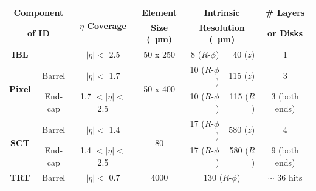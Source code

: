 {\renewcommand{\arraystretch}{1.1}
  \begin{table}[!htb]
    \vspace{-0.2em}
\centering
\begin{tabular}{|cc||c|c|rr|c|}
  \hline
  \multicolumn{2}{|c||}{\textbf{Component}} & \multirow{2}{*}{\textbf{$\eta$ Coverage}} & \textbf{Element} &  \multicolumn{2}{c|}{\textbf{Intrinsic}} & \textbf{\# Layers} \\
  \multicolumn{2}{|c||}{\textbf{of ID}}     &       & \textbf{Size (\SI{}{\micro\metre})}  & \multicolumn{2}{c|}{\textbf{Resolution (\SI{}{\micro\metre})}} &  \textbf{or Disks}          \\
  \hline
  \multirow{2}{*}{\textbf{IBL}} & & \multirow{2}{*}{$|\eta| \lt$  2.5}   & \multirow{2}{*}{50 x 250} & \multirow{2}{*}{8 ($R$-$\phi$)}& \multirow{2}{*}{40 ($z$)}  & \multirow{2}{*}{1} \\ %
   &&&&&&\\\hline                                                                                                                                                  
  \multirow{2}{*}{\textbf{Pixel}} & Barrel    &  $|\eta| \lt$  1.7            & \multirow{2}{*}{50 x 400} & 10 ($R$-$\phi$)        & 115 ($z$)          & 3                \\ %
                         & End-cap   &         1.7  $\lt |\eta| \lt$  2.5    &                    & 10 ($R$-$\phi$)        & 115 ($R$)          & 3 (both ends)    \\ %
  \hline                                                                                                                                                
  \multirow{2}{*}{\textbf{SCT}}   & Barrel    & $|\eta| \lt$  1.4             &\multirow{2}{*}{80}       &  17 ($R$-$\phi$)        & 580 ($z$)          & 4                \\ %
                         & End-cap   &        1.4  $\lt |\eta| \lt$  2.5    &                   &  17 ($R$-$\phi$)        & 580 ($R$)          & 9 (both ends)    \\ %
  \hline                                                                                                                                                
  \multirow{2}{*}{\textbf{TRT}}   & Barrel    & $|\eta| \lt$  0.7             & \multirow{2}{*}{4000}     & \multicolumn{2}{c|}{\multirow{2}{*}{130 ($R$-$\phi$)}}     & $\sim$ 36 hits    \\ %

\end{tabular}
\end{table}}
